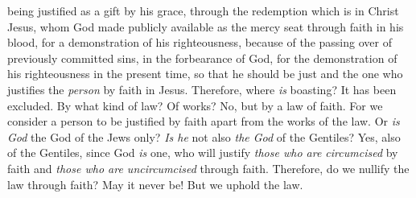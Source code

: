 \begin{biblechapter}
\verse being justified as a gift by his grace, through the redemption which is in Christ Jesus,
\verse whom God made publicly available as the mercy seat through faith in his blood, for a demonstration of his righteousness, because of the passing over of previously committed sins,
\verse in the forbearance of God, for the demonstration of his righteousness in the present time, so that he should be just and the one who justifies the \textit{person} by faith in Jesus.
\verse Therefore, where \textit{is} boasting? It has been excluded. By what kind of law? Of works? No, but by a law of faith.
\verse For we consider a person to be justified by faith apart from the works of the law.
\verse Or \textit{is God} the God of the Jews only? \textit{Is he} not also \textit{the God} of the Gentiles? Yes, also of the Gentiles,
\verse since God \textit{is} one, who will justify \textit{those who are circumcised} by faith and \textit{those who are uncircumcised} through faith.
\verse Therefore, do we nullify the law through faith? May it never be! But we uphold the law.
\end{biblechapter}

